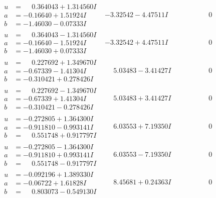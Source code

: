\documentclass[1p]{elsarticle_modified}
\theoremstyle{definition}
\begin{document}
$$\begin{array}{c|c|c}
\begin{aligned}
u &= \phantom{-}0.364043 + 1.314560 I \\
a &= -0.16640 + 1.51924 I \\
b &= -1.46030 - 0.07333 I\end{aligned}
 & -3.32542 - 4.47511 I & \phantom{-0.000000 } 0 \\ \hline\begin{aligned}
u &= \phantom{-}0.364043 - 1.314560 I \\
a &= -0.16640 - 1.51924 I \\
b &= -1.46030 + 0.07333 I\end{aligned}
 & -3.32542 + 4.47511 I & \phantom{-0.000000 } 0 \\ \hline\begin{aligned}
u &= \phantom{-}0.227692 + 1.349670 I \\
a &= -0.67339 - 1.41304 I \\
b &= -0.310421 + 0.278426 I\end{aligned}
 & \phantom{-}5.03483 - 3.41427 I & \phantom{-0.000000 } 0 \\ \hline\begin{aligned}
u &= \phantom{-}0.227692 - 1.349670 I \\
a &= -0.67339 + 1.41304 I \\
b &= -0.310421 - 0.278426 I\end{aligned}
 & \phantom{-}5.03483 + 3.41427 I & \phantom{-0.000000 } 0 \\ \hline\begin{aligned}
u &= -0.272805 + 1.364300 I \\
a &= -0.911810 - 0.993141 I \\
b &= \phantom{-}0.551748 + 0.917797 I\end{aligned}
 & \phantom{-}6.03553 + 7.19350 I & \phantom{-0.000000 } 0 \\ \hline\begin{aligned}
u &= -0.272805 - 1.364300 I \\
a &= -0.911810 + 0.993141 I \\
b &= \phantom{-}0.551748 - 0.917797 I\end{aligned}
 & \phantom{-}6.03553 - 7.19350 I & \phantom{-0.000000 } 0 \\ \hline\begin{aligned}
u &= -0.092196 + 1.389330 I \\
a &= -0.06722 + 1.61828 I \\
b &= \phantom{-}0.803073 - 0.549130 I\end{aligned}
 & \phantom{-}8.45681 + 0.24363 I & \phantom{-0.000000 } 0 \\ \hline\begin{aligned}

\end{aligned}
\end{array}$$
\end{document}

